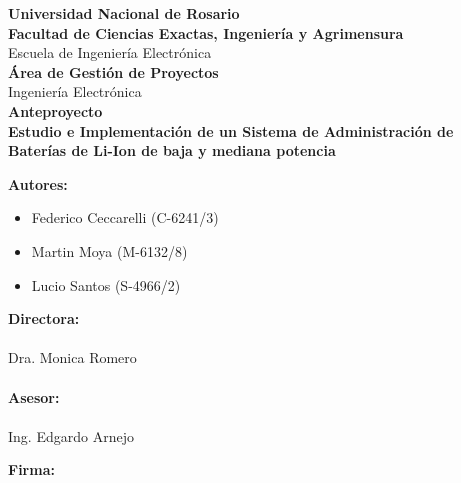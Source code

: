 \documentclass[10pt,a4paper]{article}
\begin{document}
\begin{titlepage}
\begin{center}
			\large{ \textbf{Universidad Nacional de Rosario}} \\[5mm]
			\textbf{Facultad de Ciencias Exactas, Ingeniería y Agrimensura} \\[5mm]
			Escuela de Ingeniería Electrónica \\[20mm]
			\Large {\textbf{Área de Gestión de Proyectos}}\\[1.5mm]
			\small {Ingeniería Electrónica} \\[20mm]
			\Large {\textbf{Anteproyecto}} \\[5mm]
			\Large{ \textbf{Estudio e Implementación de un Sistema de Administración de Baterías de Li-Ion de baja y mediana potencia}} \\[15mm]
			
		\end{center}
		\begin{minipage}[t]{0.5\textwidth}
			{\large\textbf{Autores:}}
			\begin{itemize}
				\item Federico Ceccarelli (C-6241/3)
				\item Martin Moya (M-6132/8)
				\item Lucio Santos (S-4966/2)
			\end{itemize}
			\vspace{10pt}
			{\large\textbf{Directora:}}\\
			\\
			Dra. Monica Romero\\
			\\
			{\large\textbf{Asesor:}}\\
			\\
			Ing. Edgardo Arnejo
			
			
		\end{minipage}
		\begin{minipage}[t]{0.5\textwidth}
			\Large\textbf{Firma:}
		\end{minipage}
		
		
	\end{titlepage}
	
    
    \clearpage
    
\end{document}
